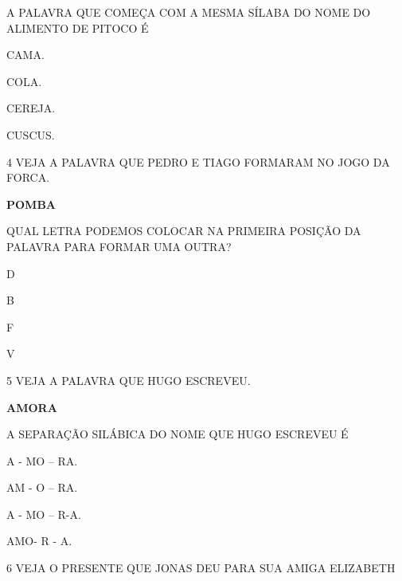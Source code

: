 A PALAVRA QUE COMEÇA COM A MESMA SÍLABA DO NOME DO ALIMENTO DE PITOCO É

\begin{escolha}
\item CAMA.

\item COLA.

\item CEREJA.

\item CUSCUS.

\end{escolha}

\num{4} VEJA A PALAVRA QUE PEDRO E TIAGO FORMARAM NO JOGO DA FORCA.

\begin{center}
\textbf{POMBA}
\end{center}

QUAL LETRA PODEMOS COLOCAR NA PRIMEIRA POSIÇÃO DA PALAVRA PARA FORMAR UMA OUTRA?

\begin{escolha}
\item D

\item B

\item F

\item V

\end{escolha}

\num{5} VEJA A PALAVRA QUE HUGO ESCREVEU.

\begin{center}
\textbf{AMORA}
\end{center}

A SEPARAÇÃO SILÁBICA DO NOME QUE HUGO ESCREVEU É

\begin{escolha}

\item A - MO – RA.

\item AM - O – RA.

\item A - MO – R-A.

\item AMO- R - A.

\end{escolha}

\num{6} VEJA O PRESENTE QUE JONAS DEU PARA SUA AMIGA ELIZABETH

